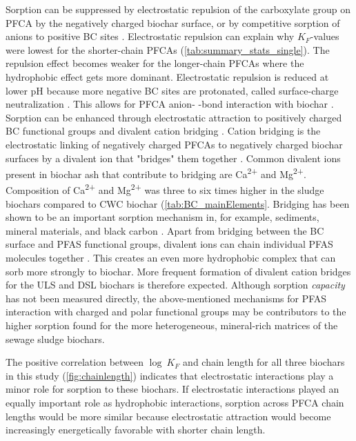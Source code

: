 Sorption can be suppressed by electrostatic repulsion of the carboxylate group on PFCA by the negatively charged biochar surface, or by competitive sorption of anions to positive BC sites \citep{sigmund2022sorption}. Electrostatic repulsion can explain why $K_F$-values were lowest for the shorter-chain PFCAs (\cref{tab:summary_stats_single}). The repulsion effect becomes weaker for the longer-chain PFCAs where the hydrophobic effect gets more dominant. Electrostatic repulsion is reduced at lower pH because more negative BC sites are protonated, called surface-charge neutralization \citep{zhang2013sorption}. This allows for PFCA anion- \textpi-bond interaction with biochar \citep{sigmund2022sorption}. Sorption can be enhanced through electrostatic attraction to positively charged BC functional groups and divalent cation bridging \citep{du2014adsorption}. Cation bridging is the electrostatic linking of negatively charged PFCAs to negatively charged biochar surfaces by a divalent ion that "bridges" them together \citep{sigmund2022sorption}. Common divalent ions present in biochar ash that contribute to bridging are Ca\textsuperscript{2+} and Mg\textsuperscript{2+}. Composition of Ca\textsuperscript{2+} and Mg\textsuperscript{2+} was three to six times higher in the sludge biochars compared to CWC biochar (\cref{tab:BC_mainElements}. Bridging has been shown to be an important sorption mechanism in, for example, sediments, mineral materials, and black carbon \citep{higgins2006sorption}. Apart from bridging between the BC surface and PFAS functional groups, divalent ions can chain individual PFAS molecules together \citep{wang2011}. This creates an even more hydrophobic complex that can sorb more strongly to biochar. More frequent formation of divalent cation bridges for the ULS and DSL biochars is therefore expected. Although sorption \textit{capacity} has not been measured directly, the above-mentioned mechanisms for PFAS interaction with charged and polar functional groups may be contributors to the higher sorption found for the more heterogeneous, mineral-rich matrices of the sewage sludge biochars.

The positive correlation between $\log~K_F$ and chain length for all three biochars in this study (\cref{fig:chainlength}) indicates that electrostatic interactions play a minor role for sorption to these biochars. If electrostatic interactions played an equally important role as hydrophobic interactions, sorption across PFCA chain lengths would be more similar because electrostatic attraction would become increasingly energetically favorable with shorter chain length. 

